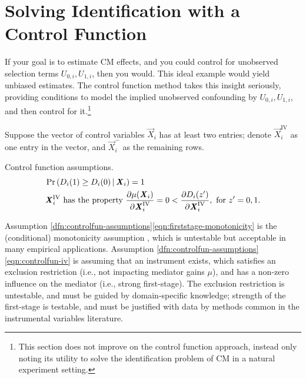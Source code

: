 \section{Solving Identification with a Control Function}
\label{sec:controlfun}
If your goal is to estimate CM effects, and you could control for unobserved selection terms $U_{0,i}, U_{1,i}$, then you would.
This ideal example would yield unbiased estimates.
The control function method takes this insight seriously, providing conditions to model the implied unobserved confounding by $U_{0,i}, U_{1,i}$, and then control for it.\footnote{
    This section does not improve on the control function approach, instead only noting its utility to solve the identification problem of CM in a natural experiment setting.
}

Suppose the vector of control variables $\vec X_i$ has at least two entries;
denote $\vec X_i^{\text{IV}}$ as one entry in the vector, and $\vec X_i^-$ as the remaining rows.
\begin{definition}
    \label{dfn:controlfun-assumptions}
    Control function assumptions.
    \begin{align}
        \label{eqn:firststage-monotonicity}
        &\Probgiven{ D_i(1) \geq D_i(0) }{\vec X_i} = 1    \\
        \label{eqn:controlfun-iv}
        &\vec X_i^{\text{IV}} \text{ has the property }
        \partialdiff[\mu(\vec X_i)]{\vec X_i^{\text{IV}}} = 0 < \partialdiff[D_i(z')]{\vec X_i^{\text{IV}}}, \textnormal{ for } z' = 0, 1.
    \end{align}
\end{definition}
Assumption \ref{dfn:controlfun-assumptions}\eqref{eqn:firststage-monotonicity} is the (conditional) monotonicity assumption \citep{imbens1994identification}, which is untestable but acceptable in many empirical applications.
Assumption \ref{dfn:controlfun-assumptions}\eqref{eqn:controlfun-iv} is assuming that an instrument exists, which satisfies an exclusion restriction (i.e., not impacting mediator gains $\mu$), and has a non-zero influence on the mediator (i.e., strong first-stage).
The exclusion restriction is untestable, and must be guided by domain-specific knowledge; strength of the first-stage is testable, and must be justified with data by methods common in the instrumental variables literature.


